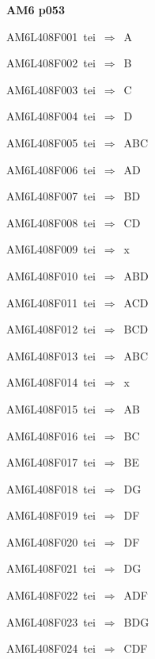 \par\vfill\eject
{\bf\hfill AM6 p053\hfill\hbox{}}\par\bigskip
{\sixrm AM6L408F001\ {\sixit tei}\ }$\Rightarrow$\ A\par\smallskip
{\sixrm AM6L408F002\ {\sixit tei}\ }$\Rightarrow$\ B\par\smallskip
{\sixrm AM6L408F003\ {\sixit tei}\ }$\Rightarrow$\ C\par\smallskip
{\sixrm AM6L408F004\ {\sixit tei}\ }$\Rightarrow$\ D\par\smallskip
{\sixrm AM6L408F005\ {\sixit tei}\ }$\Rightarrow$\ ABC\par\smallskip
{\sixrm AM6L408F006\ {\sixit tei}\ }$\Rightarrow$\ AD\par\smallskip
{\sixrm AM6L408F007\ {\sixit tei}\ }$\Rightarrow$\ BD\par\smallskip
{\sixrm AM6L408F008\ {\sixit tei}\ }$\Rightarrow$\ CD\par\smallskip
{\sixrm AM6L408F009\ {\sixit tei}\ }$\Rightarrow$\ {\tenit x}\par\smallskip
{\sixrm AM6L408F010\ {\sixit tei}\ }$\Rightarrow$\ ABD\par\smallskip
{\sixrm AM6L408F011\ {\sixit tei}\ }$\Rightarrow$\ ACD\par\smallskip
{\sixrm AM6L408F012\ {\sixit tei}\ }$\Rightarrow$\ BCD\par\smallskip
{\sixrm AM6L408F013\ {\sixit tei}\ }$\Rightarrow$\ ABC\par\smallskip
{\sixrm AM6L408F014\ {\sixit tei}\ }$\Rightarrow$\ {\tenit x}\par\smallskip
{\sixrm AM6L408F015\ {\sixit tei}\ }$\Rightarrow$\ AB\par\smallskip
{\sixrm AM6L408F016\ {\sixit tei}\ }$\Rightarrow$\ BC\par\smallskip
{\sixrm AM6L408F017\ {\sixit tei}\ }$\Rightarrow$\ BE\par\smallskip
{\sixrm AM6L408F018\ {\sixit tei}\ }$\Rightarrow$\ DG\par\smallskip
{\sixrm AM6L408F019\ {\sixit tei}\ }$\Rightarrow$\ DF\par\smallskip
{\sixrm AM6L408F020\ {\sixit tei}\ }$\Rightarrow$\ DF\par\smallskip
{\sixrm AM6L408F021\ {\sixit tei}\ }$\Rightarrow$\ DG\par\smallskip
{\sixrm AM6L408F022\ {\sixit tei}\ }$\Rightarrow$\ ADF\par\smallskip
{\sixrm AM6L408F023\ {\sixit tei}\ }$\Rightarrow$\ BDG\par\smallskip
{\sixrm AM6L408F024\ {\sixit tei}\ }$\Rightarrow$\ CDF\par\smallskip


